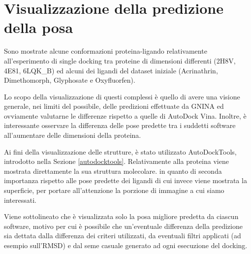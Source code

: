 

\section{Visualizzazione della predizione della posa}

Sono mostrate alcune conformazioni proteina-ligando relativamente all'esperimento di single docking tra proteine di dimensioni differenti (2H8V, 4E81, 6LQK\_B) ed alcuni dei ligandi del dataset iniziale (Acrinathrin, Dimethomorph, Glyphosate e Oxyfluorfen).

Lo scopo della visualizzazione di questi complessi è quello di avere una visione generale, nei limiti del possibile, delle predizioni effettuate da GNINA ed ovviamente valutarne le differenze rispetto a quelle di AutoDock Vina. Inoltre, è interessante osservare la differenza delle pose predette tra i suddetti software all'aumentare delle dimensioni della proteina.

Ai fini della visualizzazione delle strutture, è stato utilizzato AutoDockTools, introdotto nella Sezione \ref{autodocktools}.
Relativamente alla proteina viene mostrata direttamente la sua struttura molecolare. in quanto di seconda importanza rispetto alle pose predette dei ligandi di cui invece viene mostrata la superficie, per portare all'attenzione la porzione di immagine a cui siamo interessati.

Viene sottolineato che è visualizzata solo la posa migliore predetta da ciascun software, motivo per cui è possibile che un'eventuale differenza della predizione sia dettata dalla differenza dei criteri utilizzati, da eventuali filtri applicati (ad esempio sull'RMSD) e dal seme casuale generato ad ogni esecuzione del docking.

